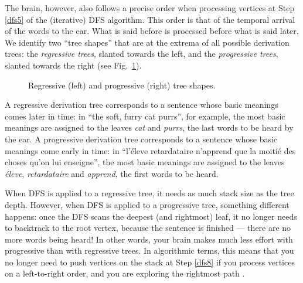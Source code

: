 \documentclass[a4paper]{book}
\theoremstyle{changebreak}                %
\begin{document}
The brain, however, also follows a precise order when processing
vertices at Step \ref{dfs5} of the (iterative) DFS algorithm. This
order is that of the temporal arrival of the words to the ear. What is
said before is processed before what is said later. We identify two
``tree shapes'' that are at the extrema of all possible derivation
trees: the {\it regressive trees}, slanted towards the left, and the
{\it progressive trees}, slanted towards the right (see
Fig.~\ref{f:regprogtree}).
\begin{figure}[!ht]
\begin{center}
\hspace*{1cm}
\end{center}
\caption{Regressive (left) and progressive (right) tree shapes.}
\label{f:regprogtree}
\end{figure}
A regressive derivation tree corresponds to a sentence whose basic
meanings comes later in time: in ``the soft, furry cat purrs'', for
example, the most basic meanings are assigned to the
leaves {\it cat} and {\it purrs}, the last words to be
heard by the ear. A progressive derivation tree corresponds to a
sentence whose basic meanings come early in time: in ``l'\'eleve
retardataire n'apprend que la moiti\'e des choses qu'on lui
enseigne'', the most basic meanings are assigned to the leaves {\it
  \'eleve}, {\it retardataire} and {\it apprend}, the first words to
be heard.

When DFS is applied to a regressive tree, it
needs as much stack size as the tree
depth. However, when DFS is applied to a progressive
tree, something different happens: once the
DFS scans the deepest (and rightmost)
leaf, it no longer needs to
backtrack to the root vertex, because the sentence
is finished --- there are no more words being heard! In other words,
your brain makes much less effort with progressive than with
regressive trees. In algorithmic terms, this means that you no longer
need to push vertices on the stack at Step \ref{dfs8} if you process
vertices on a left-to-right order, and you are exploring the rightmost
path \cite{yngve}.
\end{document}
